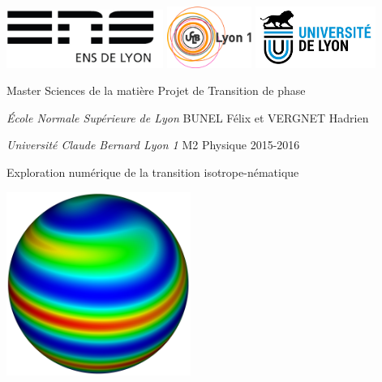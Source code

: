 \documentclass[11pt,a4paper]{article}
\author{Bunel Félix et Vergnet Hadrien}
\numberwithin{equation}{section}
\begin{document}
\begin{titlepage}
\thispagestyle{empty}
\setlength{\parindent}{0pt}

\includegraphics[height=1.9cm]{logo-ens.jpg} \hfill \includegraphics[height=2cm]{logo_lyon1.jpg} \hfill \includegraphics[height=2cm]{logo_univ_lyon.jpg}



Master Sciences de la matière
\hfill
Projet de Transition de phase 

\textit{École Normale Supérieure de Lyon}
\hfill
BUNEL Félix et VERGNET Hadrien

\textit{Université Claude Bernard Lyon 1}
\hfill
M2 Physique 2015-2016
\vspace{0.5cm}

\hrulefill
\vspace{-0.6cm}

\hrulefill


\begin{center}\bfseries
\vspace{0.3cm}
\begin{huge}
    Exploration numérique de la transition isotrope-nématique
\end{huge}
\end{center}

\hrulefill
\vspace{-0.6cm}

\hrulefill


\begin{center}
\includegraphics[height=6cm]{figures/front_simu.jpg} 
\end{center} 



\end{titlepage}
\end{document}
